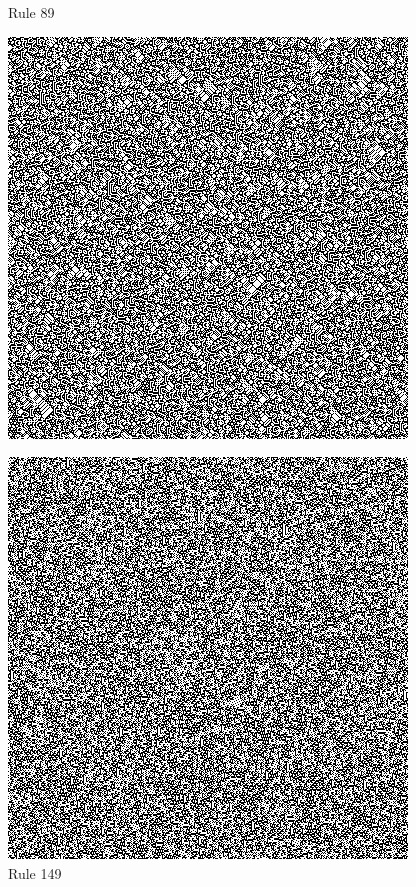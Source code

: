\documentclass{article}
\begin{document}
\begin{figure}[H]
\begin{center}
\begin{minipage}{0.48\textwidth}
      \caption{Rule 89}
      \label{fig:figure6}
      \centering
      \includegraphics[scale=.5]{89.png}
    \end{minipage}
    \begin{minipage}{0.48\textwidth}
      \caption{Rule 149}
      \label{fig:figure7}
      \centering
      \includegraphics[scale=.5]{149.png}
    \end{minipage}
  \end{center}
\end{figure}
\end{document}
